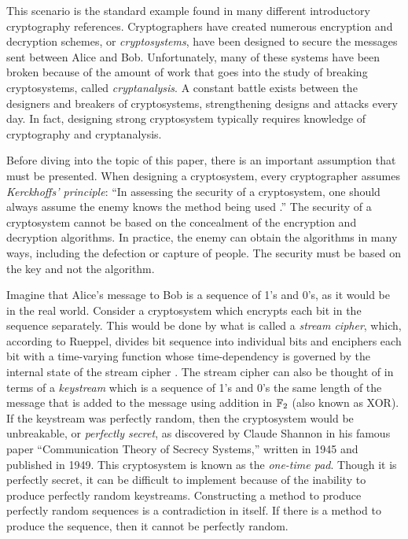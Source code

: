 \par This scenario is the standard example found in many different introductory
cryptography references. Cryptographers have created numerous encryption and decryption schemes, or {\em cryptosystems},
have been designed to secure the messages sent between Alice and Bob. Unfortunately,
many of these systems have been broken because of the amount of work that goes into
the study of breaking cryptosystems, called {\em cryptanalysis}. A constant battle
exists between the designers and breakers of cryptosystems, strengthening designs and attacks every day.
In fact, designing strong cryptosystem typically requires knowledge of cryptography and cryptanalysis.

\par Before diving into the topic of this paper, there is an important assumption that must
be presented. When designing a cryptosystem, every cryptographer assumes {\em Kerckhoffs' principle}:
``In assessing the security of a cryptosystem, one should always assume the enemy knows the method
being used \cite{trappe-washington_intro-to-crypto}.'' The security of a cryptosystem
cannot be based on the concealment of the encryption and decryption algorithms. In practice,
the enemy can obtain the algorithms in many ways, including the defection or capture
of people. The security must be based on the key and not the algorithm. 

\par Imagine that Alice's message to Bob is a sequence of 1's and 0's, as it would be
in the real world. Consider a cryptosystem which encrypts each bit in the sequence
separately. This would be done by what is called a {\em stream cipher}, which, according to Rueppel,
divides bit sequence into individual bits and enciphers each bit with a time-varying
function whose time-dependency is governed by the internal state of the stream cipher \cite{rueppel_book}.
The stream cipher can also be thought of in terms of a {\em keystream} which is a
sequence of 1's and 0's the same length of the message that is added to the message
using addition in $\mathbb{F}_2$ (also known as XOR). If the keystream was perfectly random,
then the cryptosystem would be unbreakable, or {\em perfectly secret}, as
discovered by Claude Shannon in his famous paper ``Communication Theory of Secrecy Systems,''
written in 1945 and published in 1949. This cryptosystem is known as the {\em one-time pad}.
Though it is perfectly secret, it can be difficult to implement because of the inability
to produce perfectly random keystreams. Constructing a method to produce perfectly random
sequences is a contradiction in itself. If there is a method to produce the sequence,
then it cannot be perfectly random.

